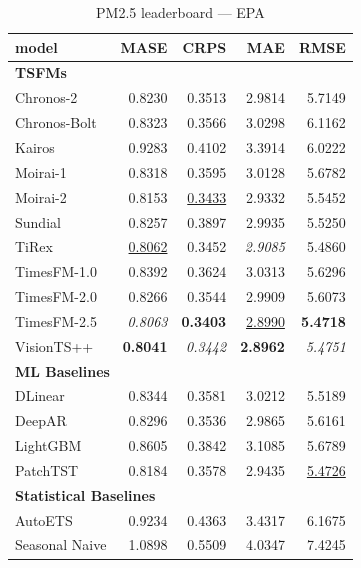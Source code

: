 \begin{table}[H]
\caption{PM2.5 leaderboard --- EPA}
\centering
\begin{small}
\begin{tabular}{lrrrr}
\toprule
model & MASE & CRPS & MAE & RMSE \\
\midrule
\multicolumn{5}{l}{\textbf{TSFMs}} \\
Chronos-2 & 0.8230 & 0.3513 & 2.9814 & 5.7149 \\
Chronos-Bolt & 0.8323 & 0.3566 & 3.0298 & 6.1162 \\
Kairos & 0.9283 & 0.4102 & 3.3914 & 6.0222 \\
Moirai-1 & 0.8318 & 0.3595 & 3.0128 & 5.6782 \\
Moirai-2 & 0.8153 & \underline{0.3433} & 2.9332 & 5.5452 \\
Sundial & 0.8257 & 0.3897 & 2.9935 & 5.5250 \\
TiRex & \underline{0.8062} & 0.3452 & \textit{2.9085} & 5.4860 \\
TimesFM-1.0 & 0.8392 & 0.3624 & 3.0313 & 5.6296 \\
TimesFM-2.0 & 0.8266 & 0.3544 & 2.9909 & 5.6073 \\
TimesFM-2.5 & \textit{0.8063} & \textbf{0.3403} & \underline{2.8990} & \textbf{5.4718} \\
VisionTS++ & \textbf{0.8041} & \textit{0.3442} & \textbf{2.8962} & \textit{5.4751} \\
\midrule
\multicolumn{5}{l}{\textbf{ML Baselines}} \\
DLinear & 0.8344 & 0.3581 & 3.0212 & 5.5189 \\
DeepAR & 0.8296 & 0.3536 & 2.9865 & 5.6161 \\
LightGBM & 0.8605 & 0.3842 & 3.1085 & 5.6789 \\
PatchTST & 0.8184 & 0.3578 & 2.9435 & \underline{5.4726} \\
\midrule
\multicolumn{5}{l}{\textbf{Statistical Baselines}} \\
AutoETS & 0.9234 & 0.4363 & 3.4317 & 6.1675 \\
Seasonal Naive & 1.0898 & 0.5509 & 4.0347 & 7.4245 \\
\bottomrule
\end{tabular}
\end{small}
\end{table}